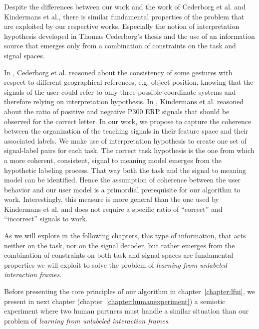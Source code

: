 Despite the differences between our work and the work of Cederborg et al. and Kindermans et al., there is similar fundamental properties of the problem that are exploited by our respective works. Especially the notion of interpretation hypothesis developed in Thomas Cederborg's thesis and the use of an information source that emerges only from a combination of constraints on the task and signal spaces. 

In \cite{cederborg2011imitating}, Cederborg et al. reasoned about the consistency of some gestures with respect to different geographical references, e.g. object position, knowing that the signals of the user could refer to only three possible coordinate systems and therefore relying on interpretation hypothesis. In \cite{Kindermans2012a,kindermans2014true}, Kindermans et al. reasoned about the ratio of positive and negative P300 ERP signals that should be observed for the correct letter. In our work, we propose to capture the coherence between the organization of the teaching signals in their feature space and their associated labels. We make use of interpretation hypothesis to create one set of signal-label pairs for each task. The correct task hypothesis is the one from which a more coherent, consistent, signal to meaning model emerges from the hypothetic labeling process. That way both the task and the signal to meaning model can be identified. Hence the assumption of coherence between the user behavior and our user model is a primordial prerequisite for our algorithm to work. Interestingly, this measure is more general than the one used by Kindermans et al. and does not require a specific ratio of  ``correct'' and ``incorrect'' signals to work.

As we will explore in the following chapters, this type of information, that acts neither on the task, nor on the signal decoder, but rather emerges from the combination of constraints on both task and signal spaces are fundamental properties we will exploit to solve the problem of \emph{learning from unlabeled interaction frames}.

\transition

Before presenting the core principles of our algorithm in chapter~\ref{chapter:lfui}, we present in next chapter (chapter~\ref{chapter:humanexperiment}) a semiotic experiment where two human partners must handle a similar situation than our problem of \emph{learning from unlabeled interaction frames}.



